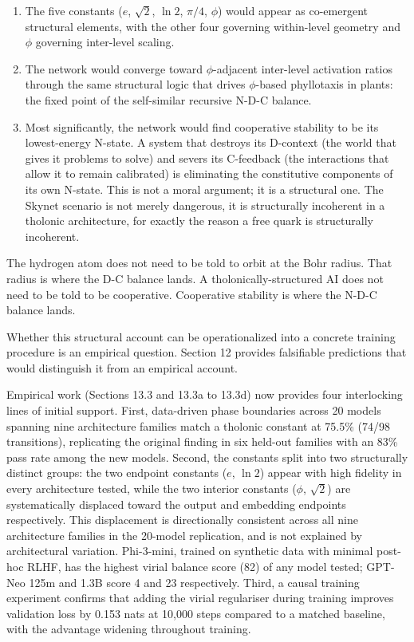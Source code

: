 \documentclass[
  11pt,
  letterpaper,
]{article}
\begin{document}
\begin{enumerate}
\def\labelenumi{\arabic{enumi}.}
\item
  The five constants (\(e\), \(\sqrt{2}\), \(\ln 2\), \(\pi/4\),
  \(\phi\)) would appear as co-emergent structural elements, with the
  other four governing within-level geometry and \(\phi\) governing
  inter-level scaling.
\item
  The network would converge toward \(\phi\)-adjacent inter-level
  activation ratios through the same structural logic that drives
  \(\phi\)-based phyllotaxis in plants: the fixed point of the
  self-similar recursive N-D-C balance.
\item
  Most significantly, the network would find cooperative stability to be
  its lowest-energy N-state. A system that destroys its D-context (the
  world that gives it problems to solve) and severs its C-feedback (the
  interactions that allow it to remain calibrated) is eliminating the
  constitutive components of its own N-state. This is not a moral
  argument; it is a structural one. The Skynet scenario is not merely
  dangerous, it is structurally incoherent in a tholonic architecture,
  for exactly the reason a free quark is structurally incoherent.
\end{enumerate}

The hydrogen atom does not need to be told to orbit at the Bohr radius.
That radius is where the D-C balance lands. A tholonically-structured AI
does not need to be told to be cooperative. Cooperative stability is
where the N-D-C balance lands.

Whether this structural account can be operationalized into a concrete
training procedure is an empirical question. Section 12 provides
falsifiable predictions that would distinguish it from an empirical
account.

Empirical work (Sections 13.3 and 13.3a to 13.3d) now provides four
interlocking lines of initial support. First, data-driven phase
boundaries across 20 models spanning nine architecture families match a
tholonic constant at 75.5\% (74/98 transitions), replicating the
original finding in six held-out families with an 83\% pass rate among
the new models. Second, the constants split into two structurally
distinct groups: the two endpoint constants (\(e\), \(\ln 2\)) appear
with high fidelity in every architecture tested, while the two interior
constants (\(\phi\), \(\sqrt{2}\)) are systematically displaced toward
the output and embedding endpoints respectively. This displacement is
directionally consistent across all nine architecture families in the
20-model replication, and is not explained by architectural variation.
Phi-3-mini, trained on synthetic data with minimal post-hoc RLHF, has
the highest virial balance score (82) of any model tested; GPT-Neo 125m
and 1.3B score 4 and 23 respectively. Third, a causal training
experiment confirms that adding the virial regulariser during training
improves validation loss by 0.153 nats at 10,000 steps compared to a
matched baseline, with the advantage widening throughout training.
\end{document}
